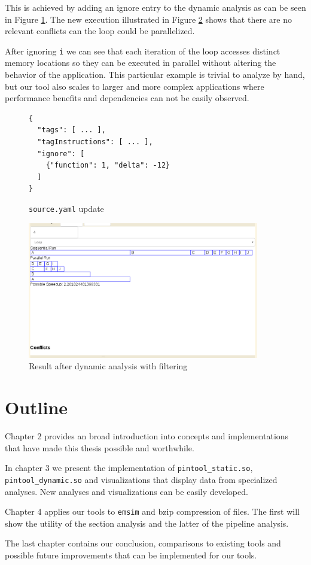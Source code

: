 This is achieved by adding an ignore entry to the dynamic analysis as can be seen in Figure \ref{cap1:example:code-ignore}. The new execution illustrated in Figure \ref{cap1:example:code-run2} shows that there are no relevant conflicts can the loop could be parallelized.

After ignoring \texttt{i} we can see that each iteration of the loop accesses distinct memory locations so they can be executed in parallel without altering the behavior of the application. This particular example is trivial to analyze by hand, but our tool also scales to larger and more complex applications where performance benefits and dependencies can not be easily observed.

\begin{figure}
	\begin{center}
		\begin{verbatim}
{
  "tags": [ ... ],
  "tagInstructions": [ ... ],
  "ignore": [
    {"function": 1, "delta": -12}
  ]
}
		\end{verbatim}
	\end{center}
	\caption{\texttt{source.yaml} update}
	\label{cap1:example:code-ignore}
\end{figure}

\begin{figure}[!ht]
	\centering
	\includegraphics[width=0.9\textwidth]{simple-run2}
	\caption{Result after dynamic analysis with filtering}
	\label{cap1:example:code-run2}
\end{figure}

\section {Outline}

Chapter 2 provides an broad introduction into concepts and implementations that have made this thesis possible and worthwhile.

In chapter 3 we present the implementation of \texttt{pintool\_static.so}, \texttt{pintool\_dynamic.so} and visualizations that display data from specialized analyses. New analyses and visualizations can be easily developed.

Chapter 4 applies our tools to \texttt{emsim} \cite{parceive} and bzip \cite{bzip} compression of files. The first will show the utility of the section analysis and the latter of the pipeline analysis.

The last chapter contains our conclusion, comparisons to existing tools and possible future improvements that can be implemented for our tools.